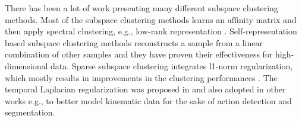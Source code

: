 \documentclass[10pt,a4paper,conference]{IEEEtran}
\begin{document}
There has been a lot of work presenting many different subspace clustering methods. Most of the subspace clustering methods learns an afﬁnity matrix and then apply spectral clustering, e.g., low-rank representation \cite{Liu2013,Lu2019}. Self-representation based subspace clustering methods reconstructs a sample from a linear combination of other samples \cite{elhamifar2013sparse,Liu2013,Hu2014,Lu2012} and they have proven their effectiveness for high-dimensional data.
Sparse subspace clustering integrates l1-norm regularization, which mostly results in improvements in the clustering performances \cite{elhamifar2013sparse}. The temporal Laplacian regularization was proposed in \cite{li2015temporal} and also adopted in other works e.g., \cite{clopton2017temporal} to better model kinematic data for the sake of action detection and segmentation.
\end{document}
